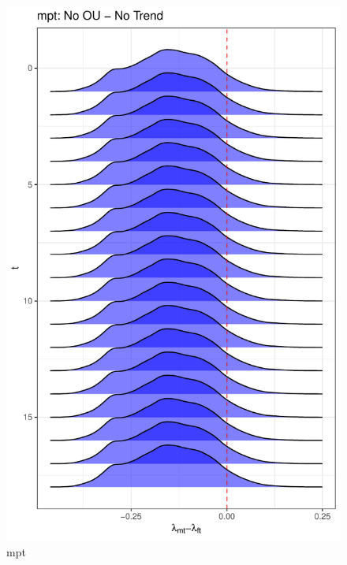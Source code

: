 \documentclass[
  12pt,
]{article}
\begin{document}
\begin{figure}

{\centering \includegraphics[width=0.9\linewidth]{../Figures/mpt/lambda_diff} 

}

\caption{mpt}\label{fig:unnamed-chunk-18}
\end{figure}
\end{document}
